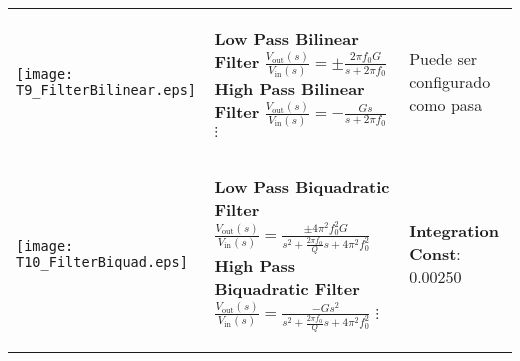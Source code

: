 \begin{table}[!ht]
\begin{tabular}{>{\centering\arraybackslash}m{3cm} >{\centering\arraybackslash}m{5cm} >{\centering\arraybackslash}m{5cm}}
    {\scriptsize \textbf{FilterBilinear}} \linebreak
    \texttt{[image: T9\_FilterBilinear.eps]}
    &
      \begin{scriptsize}
		 \textbf{Low Pass Bilinear Filter} \linebreak
      	 $\frac{V_{\mathrm{out}}(s)}{V_{\mathrm{in}}(s)} = \pm \frac{2 \pi f_{0} G}{s + 2 \pi f_{0}}$ \linebreak
      	 \textbf{High Pass Bilinear Filter} \linebreak
      	 $\frac{V_{\mathrm{out}}(s)}{V_{\mathrm{in}}(s)} = - \frac{Gs}{s + 2 \pi f_{0}}$ \linebreak
      	 $\vdots$
      \end{scriptsize}
    & 
      \begin{itemize}[leftmargin=0cm,noitemsep]
      \begin{scriptsize}
		\item[] Puede ser configurado como pasa
      \end{scriptsize}
      \end{itemize}
    \\ %
    {\scriptsize \textbf{FilterBiquad}} \linebreak
    \texttt{[image: T10\_FilterBiquad.eps]}
    &
      \begin{scriptsize}
		 \textbf{Low Pass Biquadratic Filter} \linebreak
      	 $\frac{V_{\mathrm{out}}(s)}{V_{\mathrm{in}}(s)} = \frac{\pm 4 \pi^{2} f_{0}^{2} G}{s^{2} + \frac{2 \pi f_{0}}{Q}s + 4 \pi^{2} f_{0}^{2}}$ \linebreak
      	 \textbf{High Pass Biquadratic Filter} \linebreak
      	 $\frac{V_{\mathrm{out}}(s)}{V_{\mathrm{in}}(s)} = \frac{-G s^{2}}{s^{2} + \frac{2 \pi f_{0}}{Q} s + 4 \pi^{2} f_{0}^{2}}$ \linebreak
      	 $\vdots$
      \end{scriptsize}
    & 
      \begin{itemize}[leftmargin=0cm,noitemsep]
      \begin{scriptsize}
		\item[] \textbf{Integration Const}: 0.00250 
      \end{scriptsize}
      \end{itemize}
    \\ %
    \hline
  \end{tabular}
\end{table}
